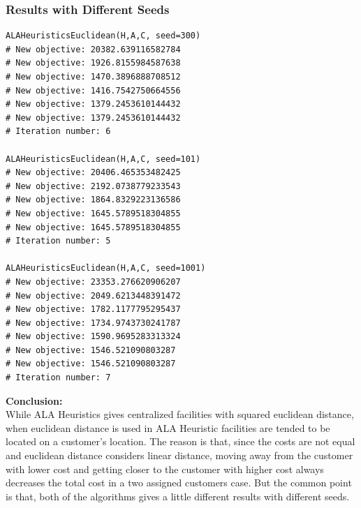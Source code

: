 \documentclass[12pt]{article}
\begin{document}
\subsubsection*{Results with Different Seeds}
\begin{lstlisting}[style=pythonstyle]
ALAHeuristicsEuclidean(H,A,C, seed=300)
# New objective: 20382.639116582784
# New objective: 1926.8155984587638
# New objective: 1470.3896888708512
# New objective: 1416.7542750664556
# New objective: 1379.2453610144432
# New objective: 1379.2453610144432
# Iteration number: 6

ALAHeuristicsEuclidean(H,A,C, seed=101)
# New objective: 20406.465353482425
# New objective: 2192.0738779233543
# New objective: 1864.8329223136586
# New objective: 1645.5789518304855
# New objective: 1645.5789518304855
# Iteration number: 5

ALAHeuristicsEuclidean(H,A,C, seed=1001)
# New objective: 23353.276620906207
# New objective: 2049.6213448391472
# New objective: 1782.1177795295437
# New objective: 1734.9743730241787
# New objective: 1590.9695283313324
# New objective: 1546.521090803287
# New objective: 1546.521090803287
# Iteration number: 7
\end{lstlisting}

\textbf{Conclusion:}\\
While ALA Heuristics gives centralized facilities with squared euclidean distance, when euclidean distance is used in ALA Heuristic facilities are tended to be located on a customer's location. The reason is that, since the costs are not equal and euclidean distance considers linear distance, moving away from the customer with lower cost and getting closer to the customer with higher cost always decreases the total cost in a two assigned customers case. But the common point is that, both of the algorithms gives a little different results with different seeds.
\end{document}
